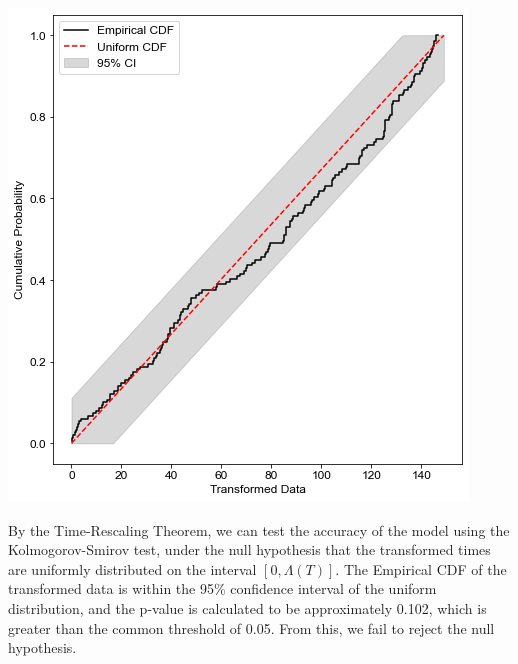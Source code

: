 \documentclass[landscape,final,a0paper]{../baposter}
\begin{document}
\begin{poster}
{    \includegraphics[width=\textwidth]{Blackboard files/img/test_final.png}

 \vspace{0.3em}


By the Time-Rescaling Theorem, we can test the accuracy of the model using the Kolmogorov-Smirov test, under the null hypothesis that the transformed times are uniformly distributed on the interval $[0, \Lambda(T)]$. The Empirical CDF of the transformed data is within the 95\% confidence interval of the uniform distribution, and the p-value is calculated to be approximately 0.102, which is greater than the common threshold of 0.05. From this, we fail to reject the null hypothesis.



  }



\end{poster}
\end{document}
